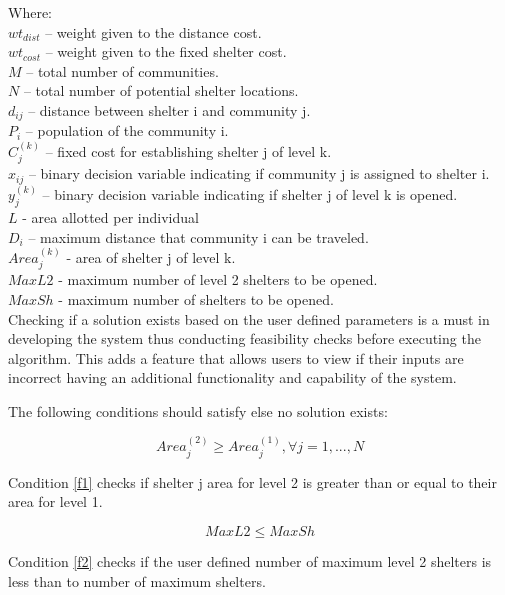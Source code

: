 \documentclass[12pt,a4paper,]{article}
\begin{document}
	\noindent Where:
	\\$wt_{dist}$ – weight given to the distance cost.
	\\$wt_{cost}$ – weight given to the fixed shelter cost.
	\\$M$ – total number of communities.
	\\$N$ – total number of potential shelter locations.
	\\$d_{ij}$ – distance between shelter i and community j.
	\\$P_{i}$ – population of the community i.
	\\$C_{j}^{(k)}$ – fixed cost for establishing shelter j of level k.
	\\$x_{ij}$ – binary decision variable indicating if community j is assigned to shelter i.
	\\$y_{j}^{(k)}$ – binary decision variable indicating if shelter j of level k is opened.
	\\$L$ - area allotted per individual
	\\$D_{i}$ – maximum distance that community i can be traveled.
	\\$Area_{j}^{(k)}$ - area of shelter j of level k.
	\\$MaxL2$ - maximum number of level 2 shelters to be opened.
	\\$MaxSh$ - maximum number of shelters to be opened.
	\\
	
	Checking if a solution exists based on the user defined parameters is a must in developing the system thus conducting feasibility checks before executing the algorithm. This adds a feature that allows users to view if their inputs are incorrect having an additional functionality and capability of the system.
	
	The following conditions should satisfy else no solution exists:
	
	\begin{equation} 
		\label{f1}
		Area_{j}^{(2)} \ge Area_{j}^{(1)}, \forall j = 1, ..., N
	\end{equation}
	
	Condition \ref{f1} checks if shelter j area for level 2 is greater than or equal to their area for level 1. 
	
	\begin{equation} 
		\label{f2}
		MaxL2 \le MaxSh
	\end{equation}
	
	Condition \ref{f2} checks if the user defined number of maximum level 2 shelters is less than to number of maximum shelters.
	
\end{document}
